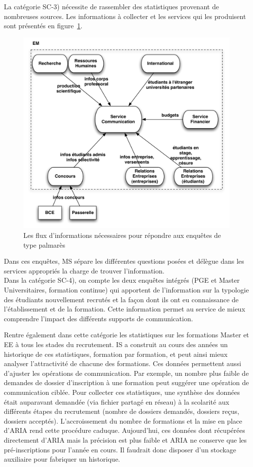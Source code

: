 \documentclass{book}
\begin{document}
La catégorie SC-3) nécessite de rassembler des statistiques provenant de 
nombreuses sources. Les informations à collecter et les services qui les 
produisent sont présentés en figure~\ref{fg:comm_flux}.
\begin{figure}[hbt]
\begin{center}
\includegraphics[width=.75\linewidth]{figs/comm_flux.pdf}
\end{center}
\caption{Les flux d'informations nécessaires pour répondre aux enquêtes de 
type palmarès}
\label{fg:comm_flux}
\end{figure}
Dans ces enquêtes, MS sépare les différentes questions posées et délègue
dans les services appropriés la charge de trouver l'information.\\


Dans la catégorie SC-4), on compte les deux enquêtes intégrés (PGE et Master 
Universitaires, formation continue) qui apportent de l'information sur la 
typologie des étudiants nouvellement recrutés et la façon dont ils ont eu 
connaissance de l'établissement et de la formation. Cette information permet 
au service de mieux comprendre l'impact des différents supports de 
communication.

Rentre également dans cette catégorie les statistiques sur les formations
Master et EE à tous les stades du recrutement. IS a construit au cours 
des années un historique de ces statistiques, formation par formation,
et peut ainsi mieux analyser l'attractivité de chacune des formations.
Ces données permettent aussi d'ajuster les opérations de communication.
Par exemple, un nombre plus faible de demandes de dossier d'inscription 
à une formation peut suggérer une opération de communication ciblée.
Pour collecter ces statistiques, une synthèse des données était auparavant
demandée (via fichier partagé en réseau) à la scolarité aux différents 
étapes du recrutement (nombre de dossiers demandés, dossiers reçus, 
dossiers acceptés). 
L'accroissement du nombre de formations et la mise en place d'ARIA rend 
cette procédure caduque. Aujourd'hui, ces données dont récupérées
directement d'ARIA mais la précision est plus faible et ARIA ne 
conserve que les pré-inscriptions pour l'année en cours. Il faudrait
donc disposer d'un stockage auxiliaire pour fabriquer un historique.
\end{document}
